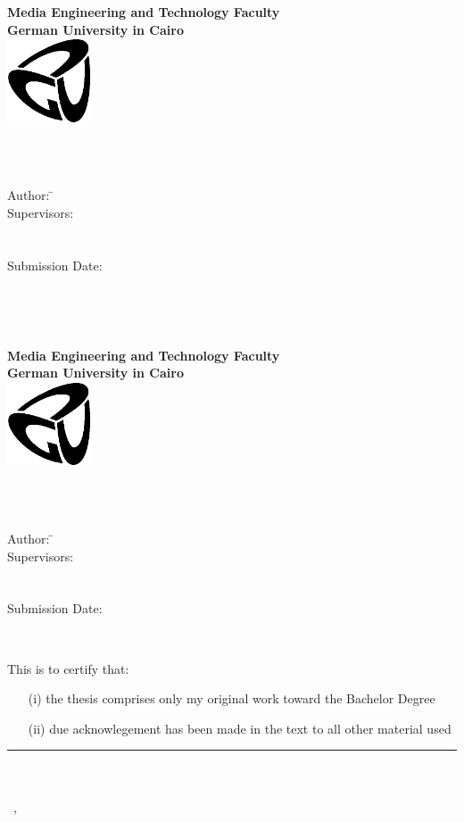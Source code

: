 \newcommand{\titlePage}{

\thispagestyle{empty}
\begin{center}
  \textbf{Media Engineering and Technology Faculty}\\[1mm]
  \textbf{German University in Cairo}\\[1mm]
  \includegraphics[width=2.5cm]{graphics/GUC-logo-ss.eps}
  
  \vspace{2cm}
  \doublespacing
  {\Huge \textbf{\titleOfThesisOne}}\\
  \singlespacing
  \vspace{2cm}
  {\large \textbf{\typeOfThesis}}\\
  
  \vfill
  \parbox{1cm}{
      \begin{large}
          \begin{tabbing}
            Author: \hspace{2cm}  
              \=\authorOfThesis\\[2mm]
            Supervisors: 
              \>\supervisorOne\\[2mm]
              \>\supervisorTwo\\[2mm]
              \>\supervisorThree\\[2mm]
            Submission Date: 
              \>\submissionDate\\
          \end{tabbing}
      \end{large}
  }\\
\end{center}
\clearpage
}
\titlePage
\thispagestyle{empty}\ \clearpage
\titlePage
\thispagestyle{empty}
This is to certify that:
\begin{itemize}
\item[(i)] the thesis comprises only my original work toward the Bachelor Degree
\item[(ii)] due acknowlegement has been made in the text to all other material used
\end{itemize}

\vspace{2cm}
\begin{flushright}
\rule[0mm]{6cm}{0.2mm}\\
\authorOfThesis\\
\submissionDay~\submissionMonth,~\submissionYear\\
\end{flushright}
\clearpage
